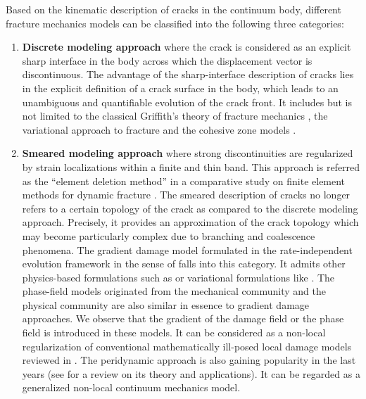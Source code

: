 Based on the kinematic description of cracks in the continuum body, different fracture mechanics models can be classified into the following three categories:
\begin{enumerate}
\item \textbf{Discrete modeling approach} where the crack is considered as an explicit sharp interface in the body across which the displacement vector is discontinuous. The advantage of the sharp-interface description of cracks lies in the explicit definition of a crack surface in the body, which leads to an unambiguous and quantifiable evolution of the crack front. It includes but is not limited to the classical Griffith's theory of fracture mechanics \cite{Freund:1990}, the variational approach to fracture \cite{FrancfortMarigo:1998,BourdinFrancfortMarigo:2008,Larsen:2010} and the cohesive zone models \cite{Barenblatt:1962}.

\item \textbf{Smeared modeling approach} where strong discontinuities are regularized by strain localizations within a finite and thin band. This approach is referred as the ``element deletion method'' in a comparative study on finite element methods for dynamic fracture \cite{SongWangBelytschko:2008}. The smeared description of cracks no longer refers to a certain topology of the crack as compared to the discrete modeling approach. Precisely, it provides an approximation of the crack topology which may become particularly complex due to branching and coalescence phenomena. The gradient damage model \cite{PhamMarigo:2010-1,PhamAmorMarigoMaurini:2011} formulated in the rate-independent evolution framework in the sense of \cite{Mielke:2005} falls into this category. It admits other physics-based formulations such as \cite{Comi:1999} or variational formulations like \cite{LorentzAndrieux:1999}. The phase-field models originated from the mechanical community \cite{HofackerMiehe:2012,MieheWelschingerHofacker:2010,BordenVerhooselScottHughesLandis:2012} and the physical community \cite{HakimKarma:2009,KarmaKesslerLevine:2001} are also similar in essence to gradient damage approaches. We observe that the gradient of the damage field or the phase field is introduced in these models. It can be considered as a non-local regularization of conventional mathematically ill-posed local damage models reviewed in \cite{Peerlings:2001aa,LorentzAndrieux:2003}. The peridynamic approach is also gaining popularity in the last years (see \cite{Silling:2010aa} for a review on its theory and applications). It can be regarded as a generalized non-local continuum mechanics model.


\end{enumerate}
